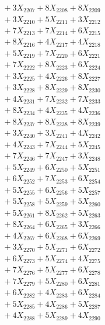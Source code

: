 \documentclass[a4paper,10pt]{article}
\begin{document}
{\begin{align}
&\;  + 3 X_{2207} + 8 X_{2208} + 8 X_{2209} \\[0.3ex]
&\;  + 3 X_{2210} + 5 X_{2211} + 3 X_{2212} \\[0.3ex]
&\;  + 7 X_{2213} + 7 X_{2214} + 6 X_{2215} \\[0.3ex]
&\;  + 8 X_{2216} + 4 X_{2217} + 4 X_{2218} \\[0.3ex]
&\;  + 5 X_{2219} + 7 X_{2220} + 6 X_{2221} \\[0.3ex]
&\;  + 7 X_{2222} + 8 X_{2223} + 6 X_{2224} \\[0.3ex]
&\;  + 3 X_{2225} + 4 X_{2226} + 8 X_{2227} \\[0.3ex]
&\;  + 3 X_{2228} + 8 X_{2229} + 8 X_{2230} \\[0.5ex]\allowbreak
&\;  + 4 X_{2231} + 7 X_{2232} + 7 X_{2233} \\[0.3ex]
&\;  + 8 X_{2234} + 4 X_{2235} + 4 X_{2236} \\[0.3ex]
&\;  + 8 X_{2237} + 8 X_{2238} + 8 X_{2239} \\[0.3ex]
&\;  + 3 X_{2240} + 3 X_{2241} + 4 X_{2242} \\[0.3ex]
&\;  + 4 X_{2243} + 7 X_{2244} + 5 X_{2245} \\[0.3ex]
&\;  + 7 X_{2246} + 7 X_{2247} + 3 X_{2248} \\[0.3ex]
&\;  + 5 X_{2249} + 6 X_{2250} + 5 X_{2251} \\[0.3ex]
&\;  + 6 X_{2252} + 7 X_{2253} + 6 X_{2254} \\[0.3ex]
&\;  + 5 X_{2255} + 6 X_{2256} + 5 X_{2257} \\[0.3ex]
&\;  + 5 X_{2258} + 5 X_{2259} + 5 X_{2260} \\[0.5ex]\allowbreak
&\;  + 5 X_{2261} + 8 X_{2262} + 5 X_{2263} \\[0.3ex]
&\;  + 8 X_{2264} + 6 X_{2265} + 3 X_{2266} \\[0.3ex]
&\;  + 4 X_{2267} + 6 X_{2268} + 6 X_{2269} \\[0.3ex]
&\;  + 3 X_{2270} + 5 X_{2271} + 6 X_{2272} \\[0.3ex]
&\;  + 6 X_{2273} + 5 X_{2274} + 4 X_{2275} \\[0.3ex]
&\;  + 7 X_{2276} + 5 X_{2277} + 6 X_{2278} \\[0.3ex]
&\;  + 7 X_{2279} + 5 X_{2280} + 6 X_{2281} \\[0.3ex]
&\;  + 6 X_{2282} + 4 X_{2283} + 6 X_{2284} \\[0.3ex]
&\;  + 5 X_{2285} + 4 X_{2286} + 5 X_{2287} \\[0.3ex]
&\;  + 4 X_{2288} + 5 X_{2289} + 4 X_{2290} \\[0.5ex]\allowbreak

\end{align}}
\end{document}
